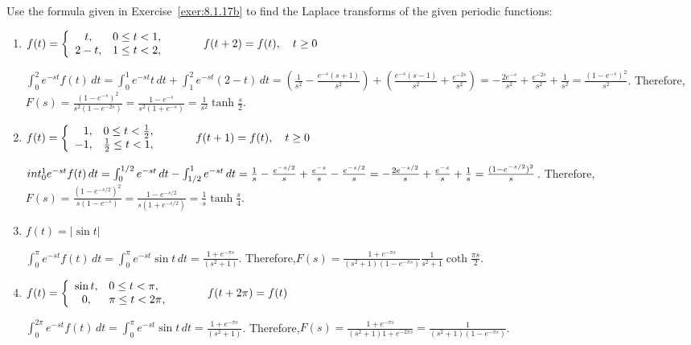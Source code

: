 \documentclass{ximera}
\begin{document}
\begin{problem}\label{exer:8.1.18}
  Use the formula given in Exercise~\ref{exer:8.1.17b} to find
the
Laplace transforms of the given periodic functions:
\begin{enumerate}
\item %
 $f(t)=\left\{\begin{array}{cl} t, & 0\le
t<1,\\ 2-t, & 1\le t<2,\end{array}\right.\hskip30pt f(t+2)=f(t),
\quad t\ge 0$

\begin{solution}
$\int_0^2e^{-st}f(t)\,dt=\int_0^1e^{-st}t\,dt+\int_1^2e^{-st}(2-t)\,dt=
\left(\frac{1}{s^2}-\frac{e^{-s}(s+1)}{s^2}\right)
+\left(\frac{e^{-s}(s-1)}{s^2}+\frac{e^{-2s}}{s^2}\right)=
-\frac{2e^{-s}}{s^2}+\frac{e^{-2s}}{s^2}+\frac{1}{s^2}
=\frac{(1-e^{-s})^2}{s^2}$. Therefore,$F(s)=\frac{(1-e^{-s})^2}{s^2(1-e^{-2s})}=\frac{1-e^{-s}}{s^2(1+e^{-s})}=
\frac{1}{s^2}\tanh\frac{s}{2}$.
\end{solution}

\item %
 $f(t)=\left\{\begin{array}{rl}1, & 0\le
t<\frac{1}{2},\\ -1, & \frac{1}{2}\le t<1,\end{array}\right.
\hskip30pt f(t+1)=f(t),\quad t\ge 0$

\begin{solution}
$\\int_0^1e^{-st}f(t)\,dt=\int_0^{1/2}e^{-st}\,dt-\int_{1/2}^1e^{-st}\,dt=
\frac{1}{s}-\frac{e^{-s/2}}{s}+
\frac{e^{-s}}{s}-\frac{e^{-s/2}}{s}=
-\frac{2e^{-s/2}}{s}+\frac{e^{-s}}{s}+\frac{1}{s}=
\frac{(1-e^{-s/2})^2}{s}$. Therefore,$F(s)=\frac{(1-e^{-s/2})^2}{s(1-e^{-s})}=\frac{1-e^{-s/2}}{s(1+e^{-s/2})}=
\frac{1}{s}\tanh\frac{s}{4}$.
\end{solution}

\item %
 $f(t)=|\sin t|$

\begin{solution}
$\int_0^\pi e^{-st}f(t)\,dt=\int_0^\pi e^{-st}\sin t\,dt=
\frac{1+e^{-\pi s}}{(s^2+1)}$. Therefore,$F(s)=\frac{1+e^{-\pi
s}}{(s^2+1)(1-e^{-\pi s})}
\frac{1}{s^2+1}\coth \frac{\pi s}{2}$.
\end{solution}
 
\item %
 $f(t)=\left\{\begin{array}{cl}\sin t, & 0\le t<
\pi,
\\ 0, &\pi\le t<2\pi,\end{array}\right.\hskip30pt
f(t+2\pi)=f(t)$

\begin{solution}
$\int_0^{2\pi}e^{-st}f(t)\,dt=\int_0^\pi
e^{-st}\sin t\,dt=
\frac{1+e^{-\pi s}}{(s^2+1)}$. Therefore,$F(s)=\frac{1+e^{-\pi s}}{(s^2+1)
1+e^{-2\pi s}}=
\frac{1}{(s^2+1)(1-e^{-\pi s})}$.
\end{solution}

\end{enumerate}
\end{problem}
\end{document}
